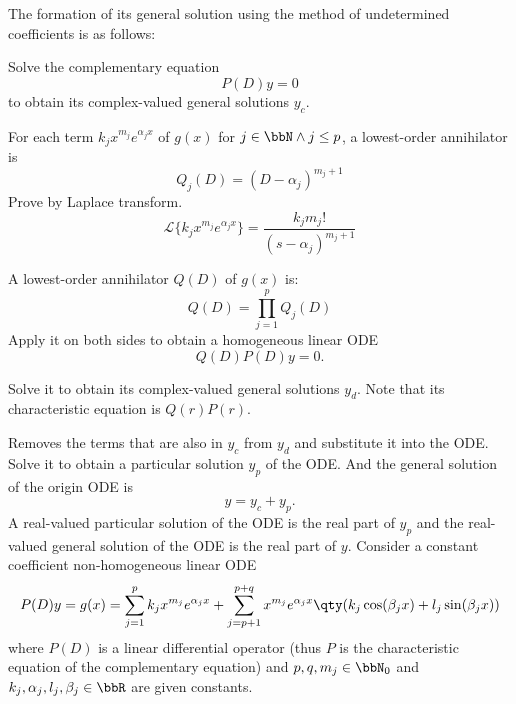 \documentclass[a4paper,12pt]{report}
\begin{document}
The formation of its general solution using the method of undetermined coefficients is as follows:
\ben
\item Solve the complementary equation
\[P(D)y=0\]
to obtain its complex-valued general solutions $y_c$.
\item For each term $k_jx^{m_j}e^{\alpha_jx}$ of $g(x)$ for $j\in\bbN\land j\leq p$, a lowest-order annihilator is
\[Q_j(D)=(D-\alpha_j)^{m_j+1}\]
\bpr
Prove by Laplace transform.
\[\mathcal{L}\{k_jx^{m_j}e^{\alpha_jx}\}=\frac{k_jm_j!}{(s-\alpha_j)^{m_j+1}}\]
\epr
\item A lowest-order annihilator $Q(D)$ of $g(x)$ is:
\[Q(D)=\prod_{j=1}^pQ_j(D)\]
Apply it on both sides to obtain a homogeneous linear ODE
\[Q(D)P(D)y=0.\]
\item Solve it to obtain its complex-valued general solutions $y_d$. Note that its characteristic equation is $Q(r)P(r)$.
\item Removes the terms that are also in $y_c$ from $y_d$ and substitute it into the ODE. Solve it to obtain a particular solution $y_p$ of the ODE. And the general solution of the origin ODE is
\[y=y_c+y_p.\]
A real-valued particular solution of the ODE is the real part of $y_p$ and the real-valued general solution of the ODE is the real part of $y$.
\een
{}
Consider a constant coefficient non-homogeneous linear ODE
\[P(D)y=g(x)=\sum_{j=1}^pk_jx^{m_j}e^{\alpha_jx}+\sum_{j=p+1}^{p+q}x^{m_j}e^{\alpha_jx}\qty(k_j\cos(\beta_jx)+l_j\sin(\beta_jx))\]
where $P(D)$ is a linear differential operator (thus $P$ is the characteristic equation of the complementary equation) and $p,q,m_j\in\bbN_0$ and $k_j,\alpha_j,l_j,\beta_j\in\bbR$ are given constants.
\end{document}
